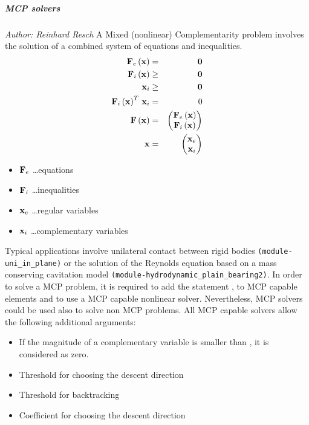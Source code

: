 \subparagraph{MCP solvers}
\emph{Author: Reinhard Resch}
\label{sec:problems:nonlin:mcp}
A Mixed (nonlinear) Complementarity problem involves the solution of a combined system of equations and inequalities.
\begin{eqnarray}
  \bold{F}_e\left(\bold{x}\right) & = & \bold{0} \\
  \bold{F}_i\left(\bold{x}\right) & \ge & \bold{0} \\
  \bold{x}_i & \ge & \bold{0} \\
  \bold{F}_i\left(\bold{x}\right)^T \, \bold{x}_i & = & 0 \\
  \bold{F}\left(\bold{x}\right) & = & \begin{pmatrix}
    \bold{F}_e\left(\bold{x}\right) \\
    \bold{F}_i\left(\bold{x}\right)
  \end{pmatrix} \\
  \bold{x} & = & \begin{pmatrix}
    \bold{x}_e \\
    \bold{x}_i
  \end{pmatrix}
\end{eqnarray}
\begin{itemize}
\item $\bold{F}_e$ \dots equations
\item $\bold{F}_i$ \dots inequalities
\item $\bold{x}_e$ \dots regular variables
\item $\bold{x}_i$ \dots complementary variables
\end{itemize}
Typical applications involve unilateral contact between rigid bodies \verb;(module-uni_in_plane); or the solution of the Reynolds equation based on a mass conserving cavitation model \verb;(module-hydrodynamic_plain_bearing2);.
In order to solve a MCP problem, it is required to add the statement ,  to MCP capable elements and to use a MCP capable nonlinear solver.
Nevertheless, MCP solvers could be used also to solve non MCP problems.
All MCP capable solvers allow the following additional arguments:
\begin{itemize}
\item {} If the magnitude of a complementary variable is smaller than , it is considered as zero.
\item {} Threshold for choosing the descent direction
\item {} Threshold for backtracking
\item {} Coefficient for choosing the descent direction
\end{itemize}

